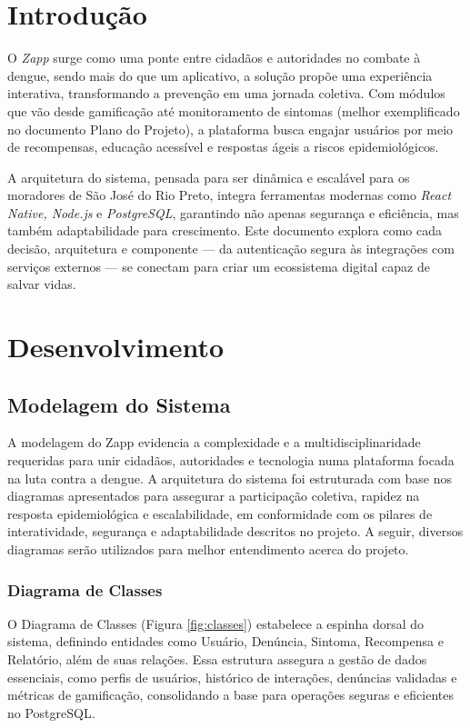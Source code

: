 \documentclass[a4paper, 12pt]{article}
\begin{document}


\newpage
\section{Introdução}

O \textit{Zapp} surge como uma ponte entre cidadãos e autoridades no combate à dengue, sendo mais do que um aplicativo, a solução propõe uma experiência interativa, transformando a prevenção em uma jornada coletiva. Com módulos que vão desde gamificação até monitoramento de sintomas (melhor exemplificado no documento Plano do Projeto), a plataforma busca engajar usuários por meio de recompensas, educação acessível e respostas ágeis a riscos epidemiológicos.

A arquitetura do sistema, pensada para ser dinâmica e escalável para os moradores de São José do Rio Preto, integra ferramentas modernas como \textit{React Native, Node.js} e \textit{PostgreSQL}, garantindo não apenas segurança e eficiência, mas também adaptabilidade para crescimento. Este documento explora como cada decisão, arquitetura e componente — da autenticação segura às integrações com serviços externos — se conectam para criar um ecossistema digital capaz de salvar vidas.

\newpage
\section{Desenvolvimento}

\subsection{Modelagem do Sistema}
A modelagem do Zapp evidencia a complexidade e a multidisciplinaridade requeridas para unir cidadãos, autoridades e tecnologia numa plataforma focada na luta contra a dengue. A arquitetura do sistema foi estruturada com base nos diagramas apresentados para assegurar a participação coletiva, rapidez na resposta epidemiológica e escalabilidade, em conformidade com os pilares de interatividade, segurança e adaptabilidade descritos no projeto. A seguir, diversos diagramas serão utilizados para melhor entendimento acerca do projeto.


\subsubsection{Diagrama de Classes}
O Diagrama de Classes (Figura \ref{fig:classes}) estabelece a espinha dorsal do sistema, definindo entidades como Usuário, Denúncia, Sintoma, Recompensa e Relatório, além de suas relações. Essa estrutura assegura a gestão de dados essenciais, como perfis de usuários, histórico de interações, denúncias validadas e métricas de gamificação, consolidando a base para operações seguras e eficientes no PostgreSQL.
\end{document}
